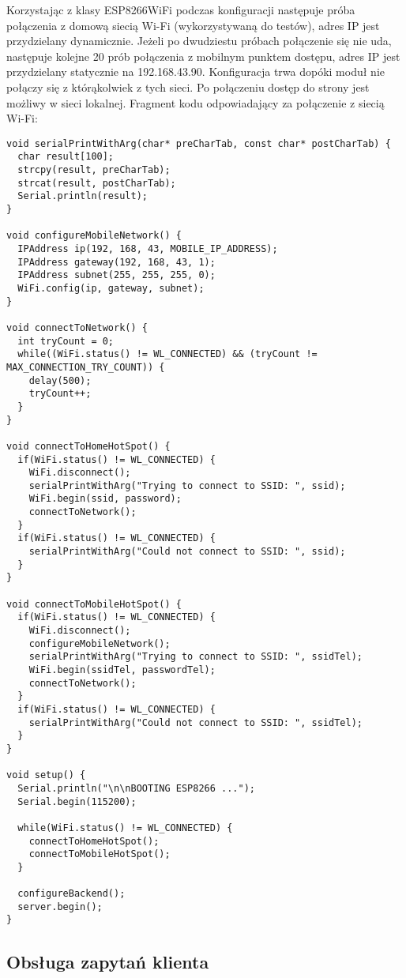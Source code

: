 \documentclass[a4paper,12pt,twoside,openany]{report}
\begin{document}
Korzystając z klasy ESP8266WiFi podczas konfiguracji następuje próba połączenia z domową siecią Wi-Fi (wykorzystywaną do testów), adres IP jest przydzielany dynamicznie. Jeżeli po dwudziestu próbach połączenie się nie uda, następuje kolejne 20 prób połączenia z mobilnym punktem dostępu, adres IP jest przydzielany statycznie na 192.168.43.90. Konfiguracja trwa dopóki moduł nie połączy się z którąkolwiek z tych sieci. Po połączeniu dostęp do strony jest możliwy w sieci lokalnej. Fragment kodu odpowiadający za połączenie z siecią Wi-Fi:\\

\begin{lstlisting}[style=customcpp]
void serialPrintWithArg(char* preCharTab, const char* postCharTab) {
  char result[100];
  strcpy(result, preCharTab);
  strcat(result, postCharTab);
  Serial.println(result);
}

void configureMobileNetwork() {
  IPAddress ip(192, 168, 43, MOBILE_IP_ADDRESS);
  IPAddress gateway(192, 168, 43, 1);
  IPAddress subnet(255, 255, 255, 0);
  WiFi.config(ip, gateway, subnet);
}

void connectToNetwork() {
  int tryCount = 0;
  while((WiFi.status() != WL_CONNECTED) && (tryCount != MAX_CONNECTION_TRY_COUNT)) {
    delay(500);
    tryCount++;
  }
}

void connectToHomeHotSpot() {
  if(WiFi.status() != WL_CONNECTED) {
    WiFi.disconnect();
    serialPrintWithArg("Trying to connect to SSID: ", ssid);
    WiFi.begin(ssid, password);
    connectToNetwork();
  }
  if(WiFi.status() != WL_CONNECTED) {
    serialPrintWithArg("Could not connect to SSID: ", ssid);
  }
}

void connectToMobileHotSpot() {
  if(WiFi.status() != WL_CONNECTED) {
    WiFi.disconnect();
    configureMobileNetwork();
    serialPrintWithArg("Trying to connect to SSID: ", ssidTel);
    WiFi.begin(ssidTel, passwordTel);
    connectToNetwork();
  }
  if(WiFi.status() != WL_CONNECTED) {
    serialPrintWithArg("Could not connect to SSID: ", ssidTel);
  }
}

void setup() {  
  Serial.println("\n\nBOOTING ESP8266 ...");
  Serial.begin(115200);  

  while(WiFi.status() != WL_CONNECTED) {
    connectToHomeHotSpot();
    connectToMobileHotSpot();
  }

  configureBackend();
  server.begin();  
}
\end{lstlisting}

\subsection{Obsługa zapytań klienta}
\end{document}
